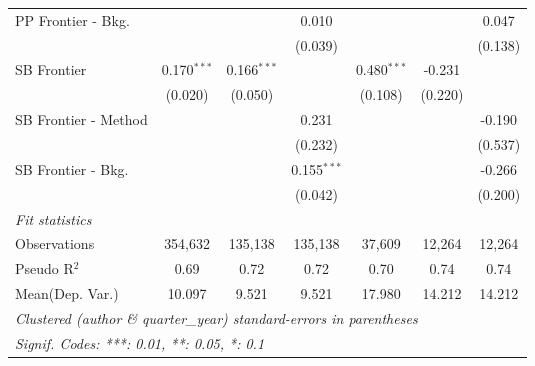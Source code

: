 \begin{tabular}{lcccccc}
   PP Frontier - Bkg.   &               &               & 0.010         &               &         & 0.047\\   
                        &               &               & (0.039)       &               &         & (0.138)\\   
   SB Frontier          & 0.170$^{***}$ & 0.166$^{***}$ &               & 0.480$^{***}$ & -0.231  &   \\   
                        & (0.020)       & (0.050)       &               & (0.108)       & (0.220) &   \\   
   SB Frontier - Method &               &               & 0.231         &               &         & -0.190\\   
                        &               &               & (0.232)       &               &         & (0.537)\\   
   SB Frontier - Bkg.   &               &               & 0.155$^{***}$ &               &         & -0.266\\   
                        &               &               & (0.042)       &               &         & (0.200)\\   
   \midrule
   \emph{Fit statistics}\\
   Observations         & 354,632       & 135,138       & 135,138       & 37,609        & 12,264  & 12,264\\  
   Pseudo R$^2$         & 0.69          & 0.72          & 0.72          & 0.70          & 0.74    & 0.74\\  
Mean(Dep. Var.) & 10.097 & 9.521 & 9.521 & 17.980 & 14.212 & 14.212 \\
   \midrule \midrule
   \multicolumn{7}{l}{\emph{Clustered (author \& quarter\_year) standard-errors in parentheses}}\\
   \multicolumn{7}{l}{\emph{Signif. Codes: ***: 0.01, **: 0.05, *: 0.1}}\\
\end{tabular}
\par\endgroup
